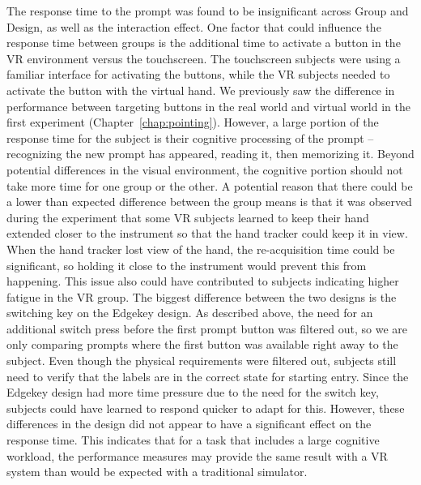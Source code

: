 The response time to the prompt was found to be insignificant across Group and Design, as well as the interaction effect.
One factor that could influence the response time between groups is the additional time to activate a button in the VR environment versus the touchscreen.
The touchscreen subjects were using a familiar interface for activating the buttons, while the VR subjects needed to activate the button with the virtual hand.
We previously saw the difference in performance between targeting buttons in the real world and virtual world in the first experiment (Chapter~\ref{chap:pointing}).
However, a large portion of the response time for the subject is their cognitive processing of the prompt -- recognizing the new prompt has appeared, reading it, then memorizing it.
Beyond potential differences in the visual environment, the cognitive portion should not take more time for one group or the other.
A potential reason that there could be a lower than expected difference between the group means is that it was observed during the experiment that some VR subjects learned to keep their hand extended closer to the instrument so that the hand tracker could keep it in view.
When the hand tracker lost view of the hand, the re-acquisition time could be significant, so holding it close to the instrument would prevent this from happening.
This issue also could have contributed to subjects indicating higher fatigue in the VR group.
The biggest difference between the two designs is the switching key on the Edgekey design.
As described above, the need for an additional switch press before the first prompt button was filtered out, so we are only comparing prompts where the first button was available right away to the subject.
Even though the physical requirements were filtered out, subjects still need to verify that the labels are in the correct state for starting entry.
Since the Edgekey design had more time pressure due to the need for the switch key, subjects could have learned to respond quicker to adapt for this.
However, these differences in the design did not appear to have a significant effect on the response time.
This indicates that for a task that includes a large cognitive workload, the performance measures may provide the same result with a VR system than would be expected with a traditional simulator.


